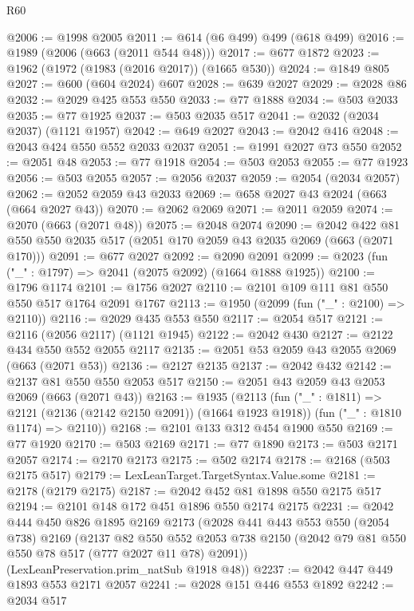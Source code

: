 \begin{lexlean}{R60}
\begin{coremodule}
@2006 := @1998 @2005
@2011 := @614 (@6 @499) @499 (@618 @499)
@2016 := @1989 (@2006 (@663 (@2011 @544 @48)))
@2017 := @677 @1872
@2023 := @1962 (@1972 (@1983 (@2016 @2017)) (@1665 @530))
@2024 := @1849 @805
@2027 := @600 (@604 @2024) @607
@2028 := @639 @2027
@2029 := @2028 @86
@2032 := @2029 @425 @553 @550
@2033 := @77 @1888
@2034 := @503 @2033
@2035 := @77 @1925
@2037 := @503 @2035 @517
@2041 := @2032 (@2034 @2037) (@1121 @1957)
@2042 := @649 @2027
@2043 := @2042 @416
@2048 := @2043 @424 @550 @552 @2033 @2037
@2051 := @1991 @2027 @73 @550
@2052 := @2051 @48
@2053 := @77 @1918
@2054 := @503 @2053
@2055 := @77 @1923
@2056 := @503 @2055
@2057 := @2056 @2037
@2059 := @2054 (@2034 @2057)
@2062 := @2052 @2059 @43 @2033
@2069 := @658 @2027 @43 @2024 (@663 (@664 @2027 @43))
@2070 := @2062 @2069
@2071 := @2011 @2059
@2074 := @2070 (@663 (@2071 @48))
@2075 := @2048 @2074
@2090 := @2042 @422 @81 @550 @550 @2035 @517 (@2051 @170 @2059 @43 @2035 @2069 (@663 (@2071 @170)))
@2091 := @677 @2027
@2092 := @2090 @2091
@2099 := @2023 (fun ("_" : @1797) => @2041 (@2075 @2092) (@1664 @1888 @1925))
@2100 := @1796 @1174
@2101 := @1756 @2027
@2110 := @2101 @109 @111 @81 @550 @550 @517 @1764 @2091 @1767
@2113 := @1950 (@2099 (fun ("_" : @2100) => @2110))
@2116 := @2029 @435 @553 @550
@2117 := @2054 @517
@2121 := @2116 (@2056 @2117) (@1121 @1945)
@2122 := @2042 @430
@2127 := @2122 @434 @550 @552 @2055 @2117
@2135 := @2051 @53 @2059 @43 @2055 @2069 (@663 (@2071 @53))
@2136 := @2127 @2135
@2137 := @2042 @432
@2142 := @2137 @81 @550 @550 @2053 @517
@2150 := @2051 @43 @2059 @43 @2053 @2069 (@663 (@2071 @43))
@2163 := @1935
    (@2113
      (fun ("_" : @1811) => @2121 (@2136 (@2142 @2150 @2091)) (@1664 @1923 @1918))
      (fun ("_" : @1810 @1174) => @2110))
@2168 := @2101 @133 @312 @454 @1900 @550
@2169 := @77 @1920
@2170 := @503 @2169
@2171 := @77 @1890
@2173 := @503 @2171 @2057
@2174 := @2170 @2173
@2175 := @502 @2174
@2178 := @2168 (@503 @2175 @517)
@2179 := LexLeanTarget.TargetSyntax.Value.some
@2181 := @2178 (@2179 @2175)
@2187 := @2042 @452 @81 @1898 @550 @2175 @517
@2194 := @2101 @148 @172 @451 @1896 @550 @2174 @2175
@2231 := @2042
    @444
    @450
    @826
    @1895
    @2169
    @2173
    (@2028
      @441
      @443
      @553
      @550
      (@2054 @738)
      @2169
      (@2137
        @82
        @550
        @552
        @2053
        @738
        @2150
        (@2042 @79 @81 @550 @550 @78 @517 (@777 @2027 @11 @78) @2091))
      (LexLeanPreservation.prim_natSub @1918 @48))
@2237 := @2042 @447 @449 @1893 @553 @2171 @2057
@2241 := @2028 @151 @446 @553 @1892
@2242 := @2034 @517

\end{coremodule}
\end{lexlean}
